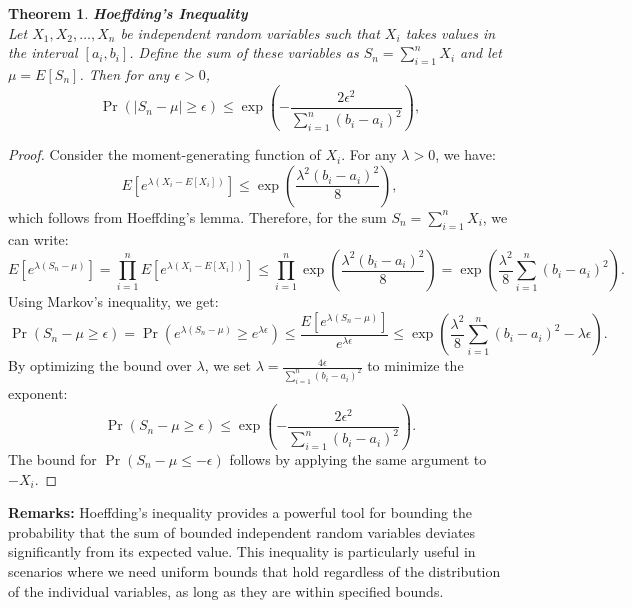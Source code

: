 \documentclass[11pt]{book} %
\newtheorem{theorem}{Theorem}[section]
\begin{document}
\begin{boxA}
    \begin{theorem}{\textbf{Hoeffding's Inequality}} \\
        Let \(X_1, X_2, \ldots, X_n\) be independent random variables such that \(X_i\) takes values in the interval \([a_i, b_i]\). Define the sum of these variables as \(S_n = \sum_{i=1}^n X_i\) and let \(\mu = E[S_n]\). Then for any \(\epsilon > 0\),
        \begin{equation*}
            \Pr\left( \left| S_n - \mu \right| \geq \epsilon\right) \leq \exp\left(-\frac{2\epsilon^2}{\sum_{i=1}^n (b_i - a_i)^2}\right),
        \end{equation*}
    \end{theorem}
\end{boxA}

\begin{proof}
    Consider the moment-generating function of \(X_i\). For any \(\lambda > 0\), we have:
    \begin{equation}
        E\left[e^{\lambda (X_i - E[X_i])}\right] \leq \exp\left(\frac{\lambda^2 (b_i - a_i)^2}{8}\right),
    \end{equation}
    which follows from Hoeffding's lemma. Therefore, for the sum \(S_n = \sum_{i=1}^n X_i\), we can write:
    \begin{equation}
        E\left[e^{\lambda (S_n - \mu)}\right] = \prod_{i=1}^n E\left[e^{\lambda (X_i - E[X_i])}\right] \leq \prod_{i=1}^n \exp\left(\frac{\lambda^2 (b_i - a_i)^2}{8}\right) = \exp\left(\frac{\lambda^2}{8} \sum_{i=1}^n (b_i - a_i)^2\right).
    \end{equation}
    Using Markov's inequality, we get:
    \begin{equation}
        \Pr(S_n - \mu \geq \epsilon) = \Pr\left(e^{\lambda (S_n - \mu)} \geq e^{\lambda \epsilon}\right) \leq \frac{E\left[e^{\lambda (S_n - \mu)}\right]}{e^{\lambda \epsilon}} \leq \exp\left(\frac{\lambda^2}{8} \sum_{i=1}^n (b_i - a_i)^2 - \lambda \epsilon\right).
    \end{equation}
    By optimizing the bound over \(\lambda\), we set \(\lambda = \frac{4 \epsilon}{\sum_{i=1}^n (b_i - a_i)^2}\) to minimize the exponent:
    \begin{equation}
        \Pr(S_n - \mu \geq \epsilon) \leq \exp\left(-\frac{2\epsilon^2}{\sum_{i=1}^n (b_i - a_i)^2}\right).
    \end{equation}
    The bound for \(\Pr(S_n - \mu \leq -\epsilon)\) follows by applying the same argument to \(-X_i\).

\end{proof}

\textbf{Remarks:}
Hoeffding's inequality provides a powerful tool for bounding the probability that the sum of bounded independent random variables deviates significantly from its expected value. This inequality is particularly useful in scenarios where we need uniform bounds that hold regardless of the distribution of the individual variables, as long as they are within specified bounds.
\end{document}
